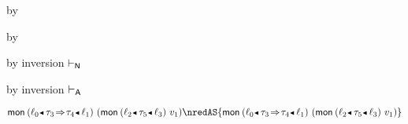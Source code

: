 {\begin{lamportproof*}
\begin{pfproof}
\begin{pfproof}
\begin{pfproof}
            \end{pfproof}
        \end{pfproof}
        \begin{pfproof}
          \absurdstep
            \begin{pfproof}
              by 
            \end{pfproof}
        \end{pfproof}
        \begin{pfproof}
          \absurdstep
            \begin{pfproof}
              by 
            \end{pfproof}
        \end{pfproof}
    \end{pfproof}

    \begin{pfproof}
        \begin{pfproof}
          by inversion $\vdash_{\mathsf{N}}$
        \end{pfproof}
        \begin{pfproof}
            \begin{pfproof}
              by inversion $\vdash_{\mathsf{A}}$
            \end{pfproof}
          \qedstep
            \begin{pfproof}
              ${\emon{\obnd{\sowner_0}{\tfun{\stype_3}{\stype_4}}{\sowner_1}}{(\emon{\obnd{\sowner_2}{\stype_5}{\sowner_3}}{\svalue_1})}} \nredAS {\emon{\obnd{\sowner_0}{\tfun{\stype_3}{\stype_4}}{\sowner_1}}{(\emon{\obnd{\sowner_2}{\stype_5}{\sowner_3}}{\svalue_1})}}$
            \end{pfproof}
        \end{pfproof}
    \end{pfproof}

\end{lamportproof*}}

